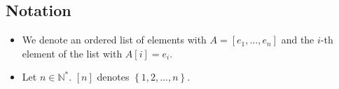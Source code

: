 \subsection{Notation}
  \begin{itemize}
    \item We denote an ordered list of elements with $A = \left[e_1, \dots,
    e_n\right]$ and the $i$-th element of the list with $A\left[i\right] = e_i$.
    \item Let $n \in \mathbb{N}^*$. $\left[n\right]$ denotes $\left\{1, 2,
    \dots, n\right\}$.
  \end{itemize}
